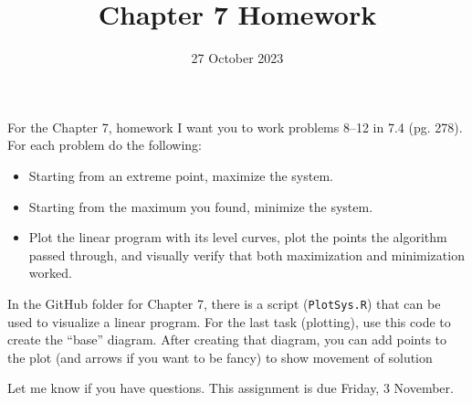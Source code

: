\documentclass{article}
\title{Chapter 7 Homework}
\date{27 October 2023}
\begin{document}
\maketitle

For the Chapter 7, homework I want you to work problems 8--12 in 7.4 (pg. 278). For each problem do the following:

\begin{itemize}
\item Starting from an extreme point, maximize the system.
\item Starting from the maximum you found, minimize the system.
\item Plot the linear program with its level curves, plot the points the algorithm passed through, and visually verify that both maximization and minimization worked.
\end{itemize}

In the GitHub folder for Chapter 7, there is a script (\texttt{PlotSys.R}) that can be used to visualize a linear program. For the last task (plotting), use this code to create the ``base'' diagram. After creating that diagram, you can add points to the plot (and arrows if you want to be fancy) to show movement of solution

Let me know if you have questions. This assignment is due Friday, 3 November.
\end{document}
